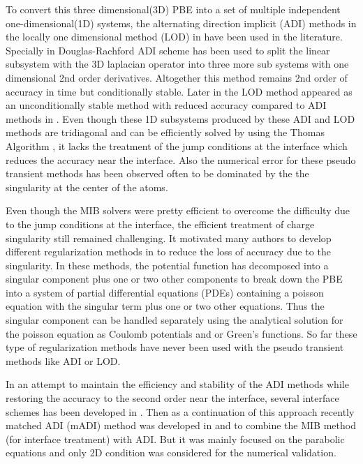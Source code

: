 To convert this three dimensional(3D) PBE into a set of multiple independent one-dimensional(1D) systems, the alternating direction implicit (ADI) methods in \cite{Fogolari2002,Geng2015,Geng2013_tree,Geng2013_Fully} the locally one dimensional method (LOD) in \cite{Wilson2016} have been used in the literature. Specially in \cite{Geng2013_Fully} Douglas-Rachford ADI scheme has been used to split the linear subsystem with the 3D laplacian operator into three more sub systems with one dimensional 2nd order derivatives. Altogether this method remains 2nd order of accuracy in time but conditionally stable. Later in \cite{Wilson2016} the LOD method appeared as an unconditionally stable method with reduced accuracy compared to ADI methods in \cite{Geng2013_Fully}. Even though these 1D subsystems produced by these ADI and LOD methods are tridiagonal and can be efficiently solved by using the Thomas Algorithm \cite{FD_PDE}, it lacks the treatment of the jump conditions at the interface which reduces the accuracy near the interface. Also the numerical error for these pseudo transient methods has been observed often to be dominated by the the singularity at the center of the atoms.

Even though the MIB solvers were pretty efficient to overcome the difficulty due to the jump conditions at the interface, the efficient treatment of charge singularity still remained challenging. It motivated many authors to develop different regularization methods in \cite{Cai2009,Chen2007, Geng2007,Holst2010,XIE2014,Zhou_1996,Geng2017a} to reduce the loss of accuracy due to the singularity. In these methods, the potential function has decomposed into a singular component plus one or two other components to break down the PBE into a system of partial differential equations (PDEs) containing a poisson equation with the singular term plus one or two other equations. Thus the singular component can be handled separately using the analytical solution for the poisson equation as Coulomb potentials and or Green's functions. So far these type of regularization methods have never been used with the pseudo transient methods like ADI or LOD. 

In an attempt to maintain the efficiency and stability of the ADI methods while restoring the accuracy to the second order near the interface, several interface schemes has been developed in \cite{Li2017,Li1999,Mayo1993,Liu2013}. Then as a continuation of this approach recently matched ADI (mADI) method was developed in \cite{Zhao2015} and \cite{Li2017} to combine the MIB method (for interface treatment) with ADI. But it was mainly focused on the parabolic equations and only 2D condition was considered for the numerical validation.

